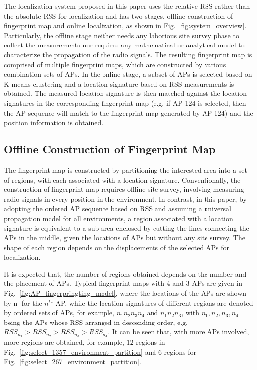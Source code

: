 \documentclass[10pt, conference, letterpaper]{IEEEtran}
\begin{document}
The localization system proposed in this paper uses the relative RSS rather than the absolute RSS for localization and has two stages, 
offline construction of fingerprint map and online localization, as shown in Fig.~\ref{fig:system_overview}. 
Particularly, the offline stage neither needs any laborious site survey phase to collect the measurements nor requires any mathematical or analytical model to characterize the propagation of the radio signals.
The resulting fingerprint map is comprised of multiple fingerprint maps, which are constructed by various combination sets of APs.
In the online stage, a subset of APs is selected based on K-means clustering and a location signature based on RSS measurements is obtained. 
The measured location signature is then matched against the location signatures 
in the corresponding fingerprint map (e.g. if AP 124 is selected, then the AP sequence will match to the fingerprint map generated by AP 124) 
and the position information is obtained.

\subsection{Offline Construction of Fingerprint Map}
The fingerprint map is constructed by partitioning the interested area into a set of regions, with each associated with a location signature. 
Conventionally, the construction of fingerprint map requires offline site survey, involving measuring radio signals in every position in the environment. 
In contrast, in this paper, by adopting the ordered AP sequence based on RSS and assuming a universal propagation model for all environments, 
a region associated with a location signature is equivalent to a sub-area enclosed by cutting the lines connecting the APs in the middle, given the locations of APs but without any site survey. 
The shape of each region depends on the displacements of the selected APs for localization.

It is expected that, the number of regions obtained depends on the number and the placement of APs. 
Typical fingerprint maps with 4 and 3 APs are given in Fig.~\ref{fig:AP_fingerpringting_model}, 
where the locations of the APs are shown by \textcircled{n} for the $n^{th}$ AP, 
while the location signatures of different regions are denoted by ordered sets of APs, for example, $n_1 n_2 n_3 n_4$ and $n_1 n_2 n_3$, 
with $n_1, n_2, n_3, n_4$ being the APs whose RSS arranged in descending order, e.g. $RSS_{n_1}>RSS_{n_2}>RSS_{n_3}>RSS_{n_4}$. 
It can be seen that, with more APs involved, more regions are obtained, for example, $12$ regions in Fig.~\ref{fig:select_1357_environment_partition} and $6$ regions for Fig.~\ref{fig:select_267_environment_partition}.
\end{document}
